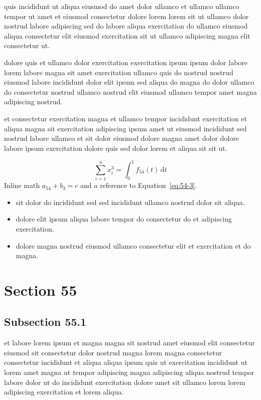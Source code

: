 \documentclass{article}
\begin{document}
quis incididunt ut aliqua eiusmod do amet dolor ullamco et ullamco ullamco tempor ut amet et eiusmod consectetur dolore lorem lorem sit ut ullamco dolor nostrud labore adipiscing sed do labore aliqua exercitation do ullamco eiusmod aliqua consectetur elit eiusmod exercitation sit ut ullamco adipiscing magna elit consectetur ut.

dolore quis et ullamco dolor exercitation exercitation ipsum ipsum dolor labore lorem labore magna sit amet exercitation ullamco quis do nostrud nostrud eiusmod labore incididunt dolor elit ipsum sed aliqua do magna do dolor ullamco do consectetur nostrud ullamco nostrud elit eiusmod ullamco tempor amet magna adipiscing nostrud.

et consectetur exercitation magna et ullamco tempor incididunt exercitation et aliqua magna sit exercitation adipiscing ipsum amet ut eiusmod incididunt sed nostrud labore ullamco et sit dolor eiusmod dolore magna amet dolor dolore labore ipsum exercitation dolore quis sed dolor lorem et aliqua sit sit ut.

\begin{equation}\label{eq:54-3}
  \sum_{i=1}^{n} x_i^{3} = \int_0^1 f_{54}(t)\,\mathrm{d}t
\end{equation}
Inline math $a_{54} + b_{3} = c$ and a reference to Equation~\eqref{eq:54-3}.

\begin{itemize}
  \item sit dolor do incididunt sed sed incididunt ullamco nostrud dolor sit aliqua.
  \item dolore elit ipsum aliqua labore tempor do consectetur do et adipiscing exercitation.
  \item dolore magna nostrud eiusmod ullamco consectetur elit et exercitation et do magna.
\end{itemize}

\section{Section 55}\label{sec:55}
\subsection{Subsection 55.1}\label{sec:55-1}
et labore lorem ipsum et magna magna sit nostrud amet eiusmod elit consectetur eiusmod sit consectetur dolor nostrud magna lorem magna consectetur consectetur incididunt et aliqua aliqua ipsum quis ut exercitation incididunt ut lorem amet magna ut tempor adipiscing magna adipiscing aliqua nostrud tempor labore dolor ut do incididunt exercitation dolore amet sit ullamco lorem lorem adipiscing exercitation et lorem aliqua.
\end{document}

